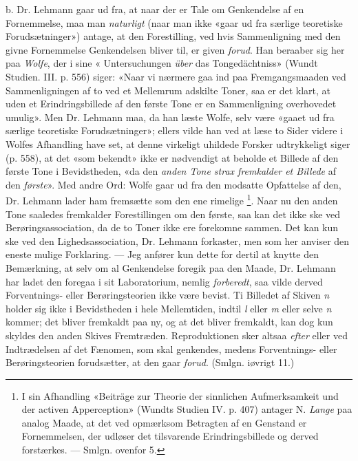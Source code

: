 \documentclass[12pt,a4paper,openany]{book}
\newcommand{\opage}[1]{\marginnote{\footnotesize\textit{[#1]}}}
\begin{document}
b. Dr. Lehmann gaar ud fra, at naar der er Tale om Genkendelse af en
Fornemmelse, maa man \emph{naturligt} (naar man ikke «gaar ud fra særlige
teoretiske Forudsætninger») antage, at den Forestilling, ved hvis Sammenligning
med den givne Fornemmelse Genkendelsen bliver til, er given \emph{forud}. Han
beraaber sig her paa \emph{Wolfe}, der i sine «
\setcounter{footnote}{0}%
\opage{31}Untersuchungen \emph{über} das Tongedächtniss» (Wundt Studien. III.
p. 556) siger: «Naar vi nærmere gaa ind paa Fremgangsmaaden ved Sammenligningen
af to ved et Mellemrum adskilte Toner, saa er det klart, at uden et
Erindringsbillede af den første Tone er en Sammenligning overhovedet umulig».
Men Dr. Lehmann maa, da han læste Wolfe, selv være «gaaet ud fra særlige
teoretiske Forudsætninger»; ellers vilde han ved at læse to Sider videre i
Wolfes Afhandling have set, at denne virkeligt uhildede Forsker udtrykkeligt
siger (p. 558), at det «som bekendt» ikke er nødvendigt at beholde et Billede
af den første Tone i Bevidstheden, «da den \emph{anden Tone strax fremkalder et
Billede} af den \emph{første}». Med andre Ord: Wolfe gaar ud fra den modsatte
Opfattelse af den, Dr. Lehmann lader ham fremsætte som den ene rimelige%
\footnote[1]{I sin Afhandling «Beiträge zur Theorie der sinnlichen
Aufmerksamkeit und der activen Apperception» (Wundts Studien IV. p. 407)
antager N. \emph{Lange} paa analog Maade, at det ved opmærksom Betragten af en
Genstand er Fornemmelsen, der udløser det tilsvarende Erindringsbillede og
derved forstærkes. --- Smlgn. ovenfor 5.}. Naar nu den anden Tone saaledes
fremkalder Forestillingen om den første, saa kan det ikke ske ved
Berøringsassociation, da de to Toner ikke ere forekomne sammen. Det kan kun ske
ved den Lighedsassociation, Dr. Lehmann forkaster, men som her anviser den
eneste mulige Forklaring. --- Jeg anfører kun dette for dertil at knytte den
Bemærkning, at selv om al Genkendelse foregik paa den Maade, Dr. Lehmann har
ladet den foregaa i sit Laboratorium, nemlig \emph{forberedt}, saa vilde derved
Forventnings- eller Berøringsteorien ikke være bevist. Ti Billedet af Skiven
\textit{n} holder sig ikke i Bevidstheden i hele Mellemtiden, indtil \textit{l}
eller \textit{m} eller selve \textit{n} kommer; det bliver fremkaldt paa ny, og
at det bliver fremkaldt, kan dog kun skyldes den anden Skives Fremtræden.
Reproduktionen sker altsaa \emph{efter} eller ved Indtrædelsen af det Fænomen,
som skal genkendes, medens Forventnings- eller Berøringsteorien forudsætter, at
den gaar \emph{forud}. (Smlgn. iøvrigt 11.)
\end{document}
